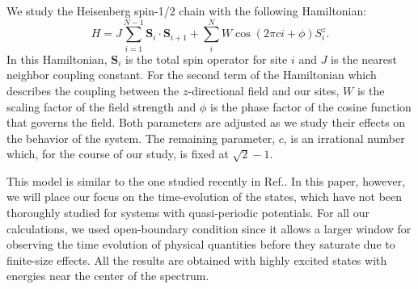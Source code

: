 \documentclass[prl,aps,epsf,showpacs,twocolumn]{revtex4}
\begin{document}
We study the Heisenberg spin-1/2 chain with the following Hamiltonian:
\begin{equation*}
  H = J\sum_{i=1}^{N-1} \mathbf{S}_i \cdot \mathbf{S}_{i+1}
  + \sum_{i}^{N} W\cos(2\pi c i+\phi) S_i^z \text{.}
\end{equation*}
In this Hamiltonian, $\mathbf{S}_i$ is the total spin operator for site $i$ and
$J$ is the nearest neighbor coupling constant.
For the second term of the Hamiltonian which describes the coupling between the
$z$-directional field and our sites, $W$ is the scaling factor of the field
strength and $\phi$ is the phase factor of the cosine function that governs the
field.
Both parameters are adjusted as we study their effects on the behavior of the
system.
The remaining parameter, $c$, is an irrational number which, for the course of
our study, is fixed at $\sqrt{2} - 1$.


This model is similar to the one studied recently in Ref.\cite{vedika2016}.
In this paper, however, we will place our focus on the time-evolution of the
states, which have not been thoroughly studied for systems with quasi-periodic
potentials.
For all our calculations, we used open-boundary condition since it allows a
larger window for observing the time evolution of physical
quantities\cite{luitz2016time} before they saturate due to finite-size effects.
All the results are obtained with highly excited states with energies near the
center of the spectrum.
\end{document}
